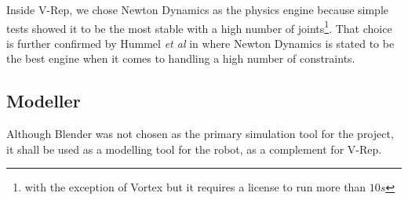 Inside V-Rep, we chose Newton Dynamics as the physics engine because simple tests showed it to be the most stable with a high number of joints\footnote{with the exception of Vortex but it requires a license to run more than $10s$}. That choice is further confirmed by Hummel \textit{et al} in \cite{hummel2012evaluation} where Newton Dynamics is stated to be the best engine when it comes to handling a high number of constraints.

\subsection{Modeller}
Although Blender was not chosen as the primary simulation tool for the project, it shall be used as a modelling tool for the robot, as a complement for V-Rep.